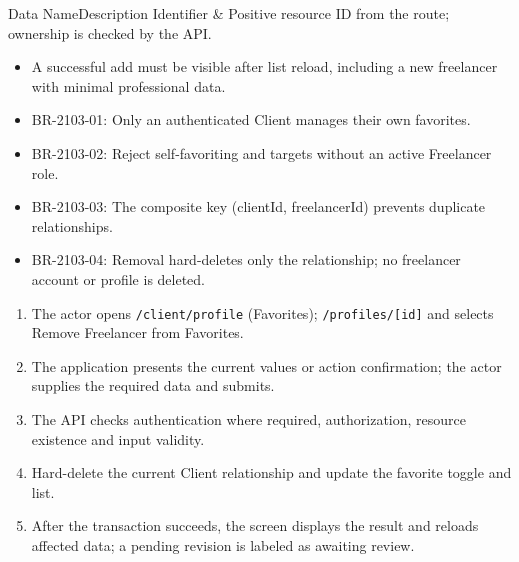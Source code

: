 
\begin{specdatatable}{Data Name}{Description}
Identifier & Positive resource ID from the route; ownership is checked by the API.\\ \hline
\end{specdatatable}

\begin{itemize}[leftmargin=1.6em,topsep=3pt,itemsep=2pt,parsep=0pt,label=$\bullet$]
    \item A successful add must be visible after list reload, including a new freelancer with minimal professional data.
\end{itemize}

\begin{itemize}[leftmargin=1.6em,topsep=3pt,itemsep=2pt,parsep=0pt,label=$\bullet$]\brrulelist
    \item BR-2103-01: Only an authenticated Client manages their own favorites.
    \item BR-2103-02: Reject self-favoriting and targets without an active Freelancer role.
    \item BR-2103-03: The composite key (clientId, freelancerId) prevents duplicate relationships.
    \item BR-2103-04: Removal hard-deletes only the relationship; no freelancer account or profile is deleted.
\end{itemize}

\begin{enumerate}[leftmargin=1.8em,topsep=3pt,itemsep=2pt,parsep=0pt]
    \item The actor opens \texttt{/\allowbreak{}client/\allowbreak{}profile} (Favorites); \texttt{/\allowbreak{}profiles/\allowbreak{}[id]} and selects Remove Freelancer from Favorites.
    \item The application presents the current values or action confirmation; the actor supplies the required data and submits.
    \item The API checks authentication where required, authorization, resource existence and input validity.
    \item Hard-delete the current Client relationship and update the favorite toggle and list.
    \item After the transaction succeeds, the screen displays the result and reloads affected data; a pending revision is labeled as awaiting review.
\end{enumerate}

